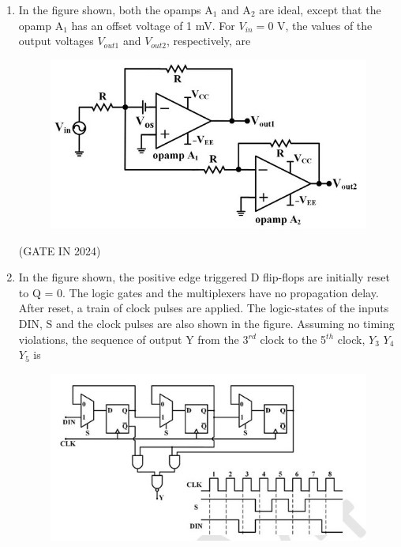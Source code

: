 \documentclass[journal,12pt,onecolumn]{IEEEtran}
\theoremstyle{remark}
\begin{document}
\begin{enumerate}
    \item In the figure shown, both the opamps A$_1$ and A$_2$ are ideal, except that the opamp A$_1$ has an offset voltage  of 1 mV. For $V_{in} = 0$ V, the values of the output voltages $V_{out1}$ and $V_{out2}$, respectively, are
    \begin{figure}[H]
        \centering
        \includegraphics[width=0.7\columnwidth]{figs/p19.jpg}
        \caption*{}
        \label{fig:p19}
    \end{figure}
    
    \hfill{(GATE IN 2024)}
    \begin{enumerate}
    \end{enumerate}

    \item In the figure shown, the positive edge triggered D flip-flops are initially reset to Q = 0. The logic gates and the multiplexers have no propagation delay. After reset, a train of clock pulses  are applied. The logic-states of the inputs DIN, S and the clock pulses are also shown in the figure. Assuming no timing violations, the sequence of output Y from the 3$^{rd}$ clock to the 5$^{th}$ clock, $Y_3$ $Y_4$ $Y_5$ is
    \begin{figure}[H]
        \centering
        \includegraphics[width=1\columnwidth]{figs/p20.jpg}
        \caption*{}
        \label{fig:p20}
    \end{figure}
    

\end{enumerate}
\end{document}
